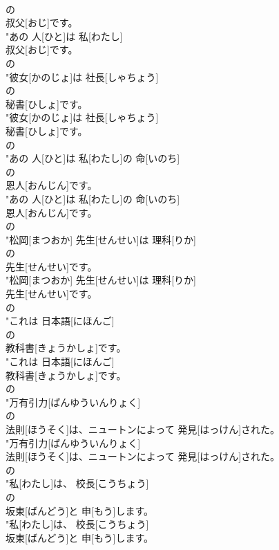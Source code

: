 \documentclass[8pt]{extreport}
\begin{document}
\begin{CJK}{UTF8}{min}
\\	の
\\	叔父[おじ]です。
\\	"あの 人[ひと]は  私[わたし]
\\	叔父[おじ]です。
\\	の
\\	"彼女[かのじょ]は 社長[しゃちょう]
\\	の
\\	秘書[ひしょ]です。
\\	"彼女[かのじょ]は 社長[しゃちょう]
\\	秘書[ひしょ]です。
\\	の
\\	"あの 人[ひと]は  私[わたし]の 命[いのち]
\\	の
\\	恩人[おんじん]です。
\\	"あの 人[ひと]は  私[わたし]の 命[いのち]
\\	恩人[おんじん]です。
\\	の
\\	"松岡[まつおか] 先生[せんせい]は 理科[りか]
\\	の
\\	先生[せんせい]です。
\\	"松岡[まつおか] 先生[せんせい]は 理科[りか]
\\	先生[せんせい]です。
\\	の
\\	"これは 日本語[にほんご]
\\	の
\\	教科書[きょうかしょ]です。
\\	"これは 日本語[にほんご]
\\	教科書[きょうかしょ]です。
\\	の
\\	"万有引力[ばんゆういんりょく]
\\	の
\\	法則[ほうそく]は、ニュートンによって 発見[はっけん]された。
\\	"万有引力[ばんゆういんりょく]
\\	法則[ほうそく]は、ニュートンによって 発見[はっけん]された。
\\	の
\\	"私[わたし]は、 校長[こうちょう]
\\	の
\\	坂東[ばんどう]と 申[もう]します。
\\	"私[わたし]は、 校長[こうちょう]
\\	坂東[ばんどう]と 申[もう]します。

\end{CJK}
\end{document}
